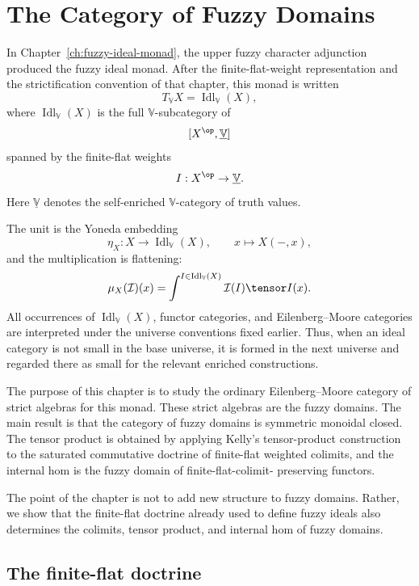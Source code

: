 \chapter{The Category of Fuzzy Domains}
\label{ch:category-fuzzy-domains}

In Chapter~\ref{ch:fuzzy-ideal-monad}, the upper fuzzy character adjunction
produced the fuzzy ideal monad.  After the finite-flat-weight representation and
the strictification convention of that chapter, this monad is written
\[
    T_{\mathbb V}X=\operatorname{Idl}_{\mathbb V}(X),
\]
where \(\operatorname{Idl}_{\mathbb V}(X)\) is the full
\(\mathbb V\)-subcategory of
\[
    [X^{\op},\underline{\mathbb V}]
\]
spanned by the finite-flat weights
\[
    I:X^{\op}\to\underline{\mathbb V}.
\]
Here \(\underline{\mathbb V}\) denotes the self-enriched
\(\mathbb V\)-category of truth values.

The unit is the Yoneda embedding
\[
    \eta_X:X\to\operatorname{Idl}_{\mathbb V}(X),
    \qquad
    x\longmapsto X(-,x),
\]
and the multiplication is flattening:
\[
    \mu_X(\mathcal I)(x)
    =
    \int^{I\in\operatorname{Idl}_{\mathbb V}(X)}
        \mathcal I(I)\tensor I(x).
\]
All occurrences of \(\operatorname{Idl}_{\mathbb V}(X)\), functor categories,
and Eilenberg--Moore categories are interpreted under the universe conventions
fixed earlier.  Thus, when an ideal category is not small in the base universe,
it is formed in the next universe and regarded there as small for the relevant
enriched constructions.

The purpose of this chapter is to study the ordinary Eilenberg--Moore category
of strict algebras for this monad.  These strict algebras are the fuzzy domains.
The main result is that the category of fuzzy domains is symmetric monoidal
closed.  The tensor product is obtained by applying Kelly's tensor-product
construction to the saturated commutative doctrine of finite-flat weighted
colimits, and the internal hom is the fuzzy domain of finite-flat-colimit-
preserving functors.

The point of the chapter is not to add new structure to fuzzy domains.  Rather,
we show that the finite-flat doctrine already used to define fuzzy ideals also
determines the colimits, tensor product, and internal hom of fuzzy domains.

\section{The finite-flat doctrine}
\label{sec:finite-flat-doctrine-fdom}

